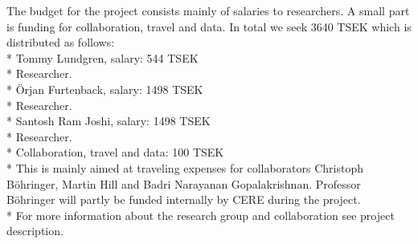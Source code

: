 The budget for the project consists mainly of salaries to researchers. A small part is funding
for collaboration, travel and data. In total we seek 3640 TSEK which is distributed as follows:\\*
Tommy Lundgren, salary: 544 TSEK\\*
Researcher.\\*
Örjan Furtenback, salary: 1498 TSEK\\*
Researcher.\\*
Santosh Ram Joshi, salary: 1498 TSEK\\*
Researcher.\\*
Collaboration, travel and data: 100 TSEK\\*
This is mainly aimed at traveling expenses for collaborators Christoph Böhringer, Martin Hill and Badri Narayanan Gopalakrishnan. Professor Böhringer will partly be funded internally by CERE during the project.\\*
For more information about the research group and collaboration see project description.
